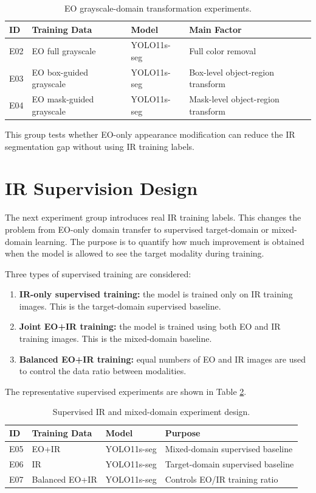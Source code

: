 \begin{table}[h]
\centering
\caption{EO grayscale-domain transformation experiments.}
\label{tab:gray_experiments}
\begin{tabular}{llll}
\hline
\textbf{ID} & \textbf{Training Data} & \textbf{Model} & \textbf{Main Factor} \\
\hline
E02 & EO full grayscale & YOLO11s-seg & Full color removal \\
E03 & EO box-guided grayscale & YOLO11s-seg & Box-level object-region transform \\
E04 & EO mask-guided grayscale & YOLO11s-seg & Mask-level object-region transform \\
\hline
\end{tabular}
\end{table}

This group tests whether EO-only appearance modification can reduce the IR segmentation gap without using IR training labels.

\section{IR Supervision Design}

The next experiment group introduces real IR training labels. This changes the problem from EO-only domain transfer to supervised target-domain or mixed-domain learning. The purpose is to quantify how much improvement is obtained when the model is allowed to see the target modality during training.

Three types of supervised training are considered:

\begin{enumerate}
    \item \textbf{IR-only supervised training:} the model is trained only on IR training images. This is the target-domain supervised baseline.
    \item \textbf{Joint EO+IR training:} the model is trained using both EO and IR training images. This is the mixed-domain baseline.
    \item \textbf{Balanced EO+IR training:} equal numbers of EO and IR images are used to control the data ratio between modalities.
\end{enumerate}

The representative supervised experiments are shown in Table \ref{tab:ir_supervision}.

\begin{table}[h]
\centering
\caption{Supervised IR and mixed-domain experiment design.}
\label{tab:ir_supervision}
\begin{tabular}{llll}
\hline
\textbf{ID} & \textbf{Training Data} & \textbf{Model} & \textbf{Purpose} \\
\hline
E05 & EO+IR & YOLO11s-seg & Mixed-domain supervised baseline \\
E06 & IR & YOLO11s-seg & Target-domain supervised baseline \\
E07 & Balanced EO+IR & YOLO11s-seg & Controls EO/IR training ratio \\
\hline
\end{tabular}
\end{table}

